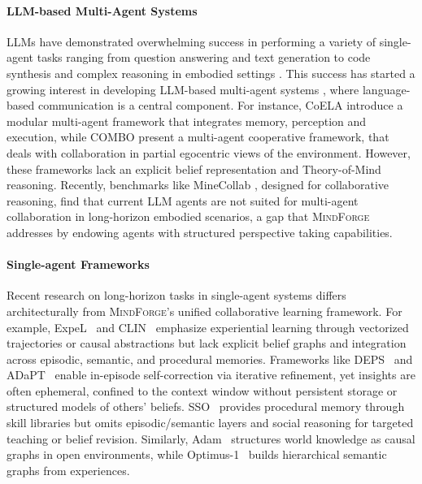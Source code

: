 \documentclass{article}
\newcommand{\collabvoyager}[0]{\mbox{\textsc{MindForge}}\xspace}
\begin{document}
\paragraph{LLM-based Multi-Agent Systems} LLMs have demonstrated overwhelming success in performing a variety of single-agent tasks ranging from question answering and text generation to code synthesis and complex reasoning in embodied settings \citep{wang2023voyager, ahn2022can, lin2023text2motion}. This success has started a growing interest in developing LLM-based multi-agent systems \citep{zhang2024combo, zhang2023building, du2023improving, talebirad2023multi, vezhnevets2023generative}, where language-based communication is a central component. For instance, CoELA \cite{zhang2023building} introduce a modular multi-agent framework that integrates memory, perception and execution, while COMBO \cite{zhang2024combo} present a multi-agent cooperative framework, that deals with collaboration in partial egocentric views of the environment. However, these frameworks lack an explicit belief representation and Theory-of-Mind reasoning. Recently, benchmarks like MineCollab \cite{white2025collaborating}, designed for collaborative reasoning, find that current LLM agents are not suited for multi-agent collaboration in long-horizon embodied scenarios, a gap that \collabvoyager addresses by endowing agents with structured perspective taking capabilities. 

\paragraph{Single-agent Frameworks}
Recent research on long-horizon tasks in single-agent systems differs architecturally from \collabvoyager's unified collaborative learning framework. For example, ExpeL~\cite{zhao2024expel} and CLIN~\cite{majumder2023clin} emphasize experiential learning through vectorized trajectories or causal abstractions but lack explicit belief graphs and integration across episodic, semantic, and procedural memories. Frameworks like DEPS~\cite{wang2023describe} and ADaPT~\cite{prasad2023adapt} enable in-episode self-correction via iterative refinement, yet insights are often ephemeral, confined to the context window without persistent storage or structured models of others' beliefs. SSO~\cite{nottingham2024skill} provides procedural memory through skill libraries but omits episodic/semantic layers and social reasoning for targeted teaching or belief revision. Similarly, Adam~\cite{yu2024adam} structures world knowledge as causal graphs in open environments, while Optimus-1~\cite{li2024optimus} builds hierarchical semantic graphs from experiences.
\end{document}

